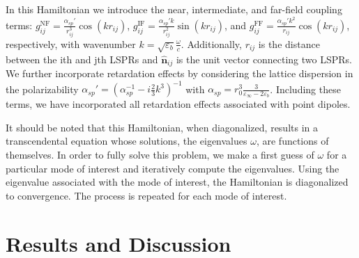 \documentclass[journal=apchd5,manuscript=article]{achemso}
\begin{document}
In this Hamiltonian we introduce the near, intermediate, and far-field coupling terms: $g_{ij}^{\textrm{NF}} = \frac{\alpha_{sp}'}{r_{ij}^3}\cos\left(k r_{ij}\right)$, $g_{ij}^{\textrm{IF}} = \frac{\alpha_{sp}'k}{r_{ij}^2}\sin\left(k r_{ij}\right)$, and $g_{ij}^{\textrm{FF}} = \frac{\alpha_{sp}'k^2}{r_{ij}}\cos\left(k r_{ij}\right)$, respectively, with wavenumber $k = \sqrt{\varepsilon_b}\frac{\omega}{c}$. Additionally, $r_{ij}$ is the distance between the ith and jth LSPRs and $\hat{\textbf{n}}_{ij}$ is the unit vector connecting two LSPRs. We further incorporate retardation effects by considering the lattice dispersion in the polarizability $\alpha_{sp}' = \left(\alpha_{sp}^{-1} - i\frac{2}{3}k^3\right)^{-1}$ with $\alpha_{sp} = r_0^3\frac{3}{\varepsilon_{\infty}-2\varepsilon_b}$. Including these terms, we have incorporated all retardation effects associated with point dipoles\cite{Purcell1973,Draine1993}.

It should be noted that this Hamiltonian, when diagonalized, results in a transcendental equation whose solutions, the eigenvalues $\omega$, are functions of themselves. In order to fully solve this problem, we make a first guess of $\omega$ for a particular mode of interest and iteratively compute the eigenvalues. Using the eigenvalue associated with the mode of interest, the Hamiltonian is diagonalized to convergence. The process is repeated for each mode of interest.

\section{Results and Discussion}
\end{document}
